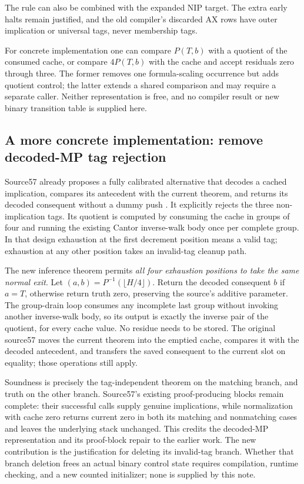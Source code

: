 \documentclass[11pt]{article}
\begin{document}
The rule can also be combined with the expanded NIP target. The extra early
halts remain justified, and the old compiler's discarded AX rows have outer
implication or universal tags, never membership tags.

For concrete implementation one can compare \(P(T,b)\) with a quotient of the
consumed cache, or compare \(4P(T,b)\) with the cache and accept residuals zero
through three. The former removes one formula-scaling occurrence but adds
quotient control; the latter extends a shared comparison and may require a
separate caller. Neither representation is free, and no compiler result or
new binary transition table is supplied here.

\subsection{A more concrete implementation: remove decoded-MP tag rejection}

Source57 already proposes a fully calibrated alternative that decodes a cached
implication, compares its antecedent with the current theorem, and returns its
decoded consequent without a dummy push \cite{decoded}. It explicitly rejects
the three non-implication tags. Its quotient is computed by consuming the cache
in groups of four and running the existing Cantor inverse-walk body once per
complete group. In that design exhaustion at the first decrement position
means a valid tag; exhaustion at any other position takes an invalid-tag
cleanup path.

The new inference theorem permits \emph{all four exhaustion positions to take
the same normal exit}. Let \((a,b)=P^{-1}(\lfloor H/4\rfloor)\). Return the
decoded consequent \(b\) if \(a=T\), otherwise return truth zero, preserving
the source's additive parameter. The group-drain loop consumes any incomplete
last group without invoking another inverse-walk body, so its output is exactly
the inverse pair of the quotient, for every cache value. No residue needs to
be stored. The original source57 moves the current theorem into the emptied
cache, compares it with the decoded antecedent, and transfers the saved
consequent to the current slot on equality; those operations still apply.

Soundness is precisely the tag-independent theorem on the matching branch,
and truth on the other branch. Source57's existing proof-producing blocks
remain complete: their successful calls supply genuine implications, while
normalization with cache zero returns current zero in both its matching and
nonmatching cases and leaves the underlying stack unchanged. This credits
the decoded-MP representation and its proof-block repair to the earlier work.
The new contribution is the justification for deleting its invalid-tag branch.
Whether that branch deletion frees an actual binary control state requires
compilation, runtime checking, and a new counted initializer; none is supplied
by this note.
\end{document}
